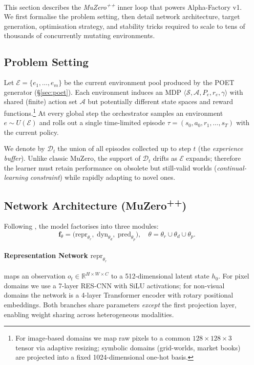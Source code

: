 This section describes the \emph{MuZero\textsuperscript{++}} inner loop that
powers Alpha-Factory v1.  We first formalise the problem setting, then detail
network architecture, target generation, optimisation strategy, and stability
tricks required to scale to tens of thousands of concurrently mutating
environments.

\subsection{Problem Setting}

Let $\mathcal E=\{e_1,\dots,e_m\}$ be the current environment pool produced by
the POET generator (§\ref{sec:poet}).  Each environment induces an MDP
$\langle\mathcal S,\mathcal A,P_e,r_e,\gamma\rangle$ with shared (finite)
action set $\mathcal A$ but potentially different state spaces and reward
functions.\footnote{For image‐based domains we map raw pixels to a common
$128\times128\times3$ tensor via adaptive resizing; symbolic domains
(grid-worlds, market books) are projected into a fixed 1024-dimensional
one-hot basis.}  At every global step the orchestrator samples an environment
$e\sim U(\mathcal E)$ and rolls out a single time-limited episode
$\tau=(s_0,a_0,r_1,\dots,s_T)$ with the current policy.

We denote by $\mathcal D_t$ the union of all episodes collected up to step $t$
(the \emph{experience buffer}).  Unlike classic MuZero, the support of
$\mathcal D_t$ drifts as $\mathcal E$ expands; therefore the learner must
retain performance on obsolete but still-valid worlds
(\emph{continual-learning constraint}) while rapidly adapting to novel ones.

\subsection{Network Architecture (MuZero\textsuperscript{++})}

Following \textcite{schrittwieser2019muzero}, the model factorises into three
modules:
\[
\mathbf f_\theta
=\bigl(\mathrm{repr}_{\theta_r},\;
        \mathrm{dyn}_{\theta_d},\;
        \mathrm{pred}_{\theta_p}\bigr),
\quad
\theta=\theta_r\cup\theta_d\cup\theta_p .
\]

\paragraph{Representation Network $\mathrm{repr}_{\theta_r}$}
maps an observation $o_t\in\mathbb R^{H\times W\times C}$ to a 512‐dimensional
latent state $h_0$.  For pixel domains we use a 7-layer RES-CNN with
SiLU activations; for non-visual domains the network is a 4-layer Transformer
encoder with rotary positional embeddings.  Both branches share parameters
\emph{except} the first projection layer, enabling weight sharing across
heterogeneous modalities.

